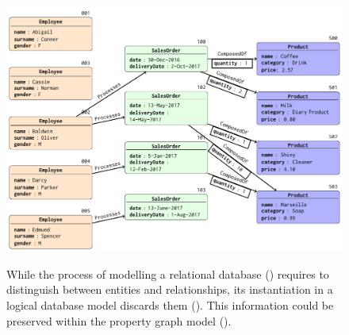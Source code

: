 \begin{figure}[!pth]
	\begin{minipage}[b]{\textwidth}
		\centering
		\includegraphics[scale=.6]{fig/02models/03dbasgraph}
		\label{fig:graphofdb1}
	\end{minipage}
	\caption{While the process of modelling a relational database () requires to distinguish between entities and relationships, its instantiation in a logical database model discards them (). This information could be preserved within the property graph model (). }
	\label{fig:relationalinstance}
\end{figure}
